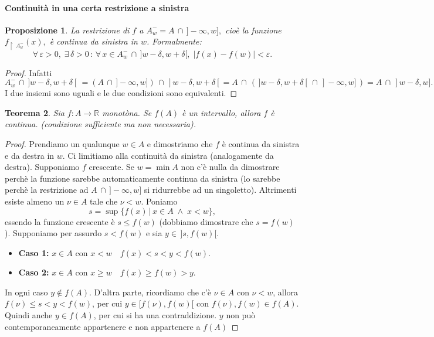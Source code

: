 \documentclass{article}
\theoremstyle{plain}
\newtheorem{thm}{Teorema}[section]
\newtheorem{prop}[thm]{Proposizione}
\theoremstyle{definition}
\theoremstyle{remark}
\begin{document}
\paragraph{Continuità in una certa restrizione a sinistra}
\begin{bxthm}
\begin{prop}
    La restrizione di $f$ a \(A^-_w=A\,\cap\,]-\infty,w],\) cioè la funzione \(f_{\upharpoonright \  A^-_w}(x),\) è continua da sinistra in $w$.
    Formalmente:
    \[\forall\,\varepsilon>0,\;\exists\,\delta>0\,:\,\forall\, x\in A^-_w\,\cap\,]w-\delta,w+\delta[,\;|f(x)-f(w)|<\varepsilon.\]
\end{prop}
\end{bxthm}
\begin{proof}
    Infatti 
    \[A^-_w\,\cap\,]w-\delta,w+\delta[\,=(A\,\cap\,]-\infty,w])\,\cap\,]w-\delta,w+\delta[=A\,\cap\,(\,]w-\delta,w+\delta[\,\cap\,]-\infty,w]\,)=A\,\cap\,]w-\delta,w].\]
    I due insiemi sono uguali e le due condizioni sono equivalenti.
\end{proof}

\vspace{10pt}

\begin{bxthm}
\begin{thm}
    Sia $f:A\to\mathbb{R}$ monotòna.
    Se $f(A)$ è un intervallo, allora $f$ è continua.
    (condizione sufficiente ma non necessaria).
\end{thm}
\end{bxthm}
\begin{proof}
    Prendiamo un qualunque $w\in A$ e dimostriamo che $f$ è continua da sinistra e da destra in $w$.
    Ci limitiamo alla continuità da sinistra (analogamente da destra).
    Supponiamo $f$ crescente.
    Se $w=\min A$ non c'è nulla da dimostrare perchè la funzione sarebbe automaticamente 
    continua da sinistra (lo sarebbe perchè la restrizione ad $A\,\cap\, ]-\infty,w]$ si ridurrebbe ad un singoletto).
    Altrimenti esiste almeno un $\nu\in A$ tale che $\nu<w$. 
    Poniamo \[s=\sup\{f(x)\,|\,x\in A\;\land\; x<w\},\]
    essendo la funzione crescente è $s\leq f(w)$ (dobbiamo dimostrare che $s=f(w)$).
    Supponiamo per assurdo $s<f(w)$ e sia $y\in\,]s,f(w)[$.
    \begin{itemize}
        \item \textbf{Caso 1: } $x\in A$ con $x<w\quad f(x)<s<y<f(w)$.
        \item \textbf{Caso 2: } $x\in A$ con $x\geq w\quad f(x)\geq f(w)>y$.
    \end{itemize}
    In ogni caso $y\notin f(A)$.
    D'altra parte, ricordiamo che c'è $\nu\in A$ con $\nu<w$, allora $f(\nu)\leq s<y<f(w)$, per cui 
    $y\in [f(\nu),f(w)[$ con $f(\nu),f(w)\in f(A)$. Quindi anche $y\in f(A)$, per cui si ha una contraddizione. 
    $y$ non può contemporaneamente appartenere e non appartenere a $f(A)$
\end{proof}
\end{document}
